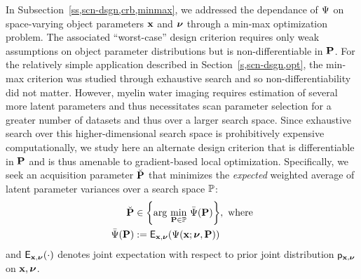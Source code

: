 In Subsection~\ref{ss,scn-dsgn,crb,minmax}, 
we addressed the dependance of $\Psi$ 
on space-varying object parameters $\mathbf{x}$ and $\boldsymbol{\nu}$
through a min-max optimization problem.
The associated ``worst-case'' design criterion 
requires only weak assumptions
on object parameter distributions
but is non-differentiable in $\mathbf{P}$.
For the relatively simple application described
in Section~\ref{s,scn-dsgn,opt},
the min-max criterion was studied 
through exhaustive search
and so non-differentiability did not matter.
However,
myelin water imaging requires estimation
of several more latent parameters
and thus necessitates scan parameter selection
for a greater number of datasets
and thus over a larger search space.
Since exhaustive search 
over this higher-dimensional search space
is prohibitively expensive computationally,
we study here an alternate design criterion
that is differentiable in $\mathbf{P}$ 
and is thus amenable 
to gradient-based local optimization.
Specifically,
we seek an acquisition parameter $\breve{\mathbf{P}}$ 
that minimizes the \emph{expected} weighted average
of latent parameter variances
over a search space $\mathbb{P}$:
\begin{align}
	\bmPc &\in 
		\set{\argmin{\bmP \in \setP} \expcost\paren{\bmP}}, \where
		\label{eq:mwf,P-hat} \\
	\expcost\paren{\bmP} &:= 
		\expect{\bmx,\bmnu}{\costa{\bmx; \bmnu, \bmP}}
		\label{eq:mwf,expcost}
\end{align}
and $\expect{\bmx,\bmnu}{\cdot}$ denotes joint expectation
with respect to prior joint distribution $\mathsf{p}_{\mathbf{x},\boldsymbol{\nu}}$ on $\mathbf{x},\boldsymbol{\nu}$.

